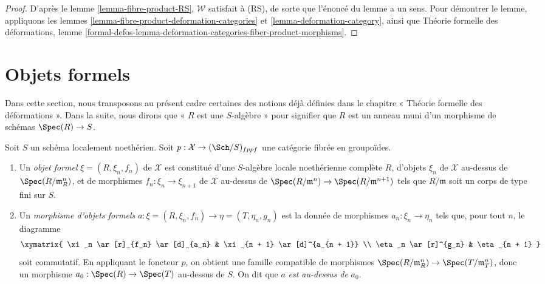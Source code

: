 \begin{proof}
D'après le lemme \ref{lemma-fibre-product-RS}, $\mathcal{W}$
satisfait à (RS), de sorte que l'énoncé du lemme a un sens. Pour démontrer
le lemme, appliquons les lemmes \ref{lemma-fibre-product-deformation-categories} et
\ref{lemma-deformation-category},
ainsi que Théorie formelle des déformations, lemme
\ref{formal-defos-lemma-deformation-categories-fiber-product-morphisms}.
\end{proof}






\section{Objets formels}
\label{section-formal-objects}

\noindent
Dans cette section, nous transposons au présent cadre certaines des notions déjà définies
dans le chapitre « Théorie formelle des déformations ». Dans la suite, nous dirons que
« $R$ est une $S$-algèbre » pour signifier
que $R$ est un anneau muni d'un morphisme de schémas $\Spec(R) \to S$.

\begin{definition}
\label{definition-formal-objects}
Soit $S$ un schéma localement noethérien. Soit
$p : \mathcal{X} \to (\Sch/S)_{fppf}$ une catégorie fibrée en groupoïdes.
\begin{enumerate}
\item Un {\it objet formel} $\xi = (R, \xi_n, f_n)$ de $\mathcal{X}$ est constitué
d'une $S$-algèbre locale noethérienne complète $R$, d'objets $\xi_n$ de
$\mathcal{X}$ au-dessus de $\Spec(R/\mathfrak m_R^n)$, et de morphismes
$f_n : \xi_n \to \xi_{n + 1}$ de $\mathcal{X}$ au-dessus de
$\Spec(R/\mathfrak m^n) \to \Spec(R/\mathfrak m^{n + 1})$
tels que $R/\mathfrak m$ soit un corps de type fini sur $S$.
\item Un {\it morphisme d'objets formels}
$a : \xi = (R, \xi_n, f_n) \to \eta = (T, \eta_n, g_n)$
est la donnée de morphismes $a_n : \xi_n \to \eta_n$ tels que, pour tout $n$,
le diagramme
$$
\xymatrix{
\xi_n \ar[r]_{f_n} \ar[d]_{a_n} & \xi_{n + 1} \ar[d]^{a_{n + 1}} \\
\eta_n \ar[r]^{g_n} & \eta_{n + 1}
}
$$
soit commutatif. En appliquant le foncteur $p$, on obtient une famille compatible
de morphismes $\Spec(R/\mathfrak m_R^n) \to \Spec(T/\mathfrak m_T^n)$, donc
un morphisme $a_0 : \Spec(R) \to \Spec(T)$ au-dessus de $S$. On dit que
$a$ {\it est au-dessus de} $a_0$.
\end{enumerate}
\end{definition}


